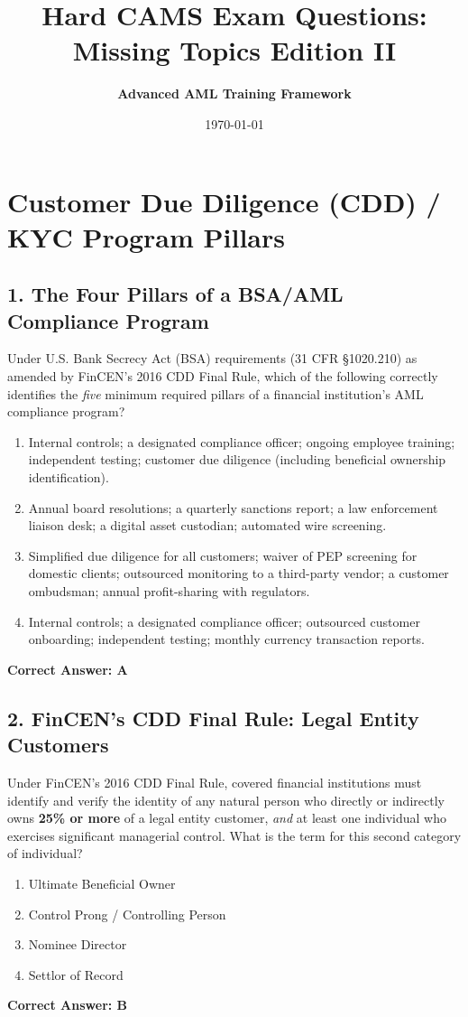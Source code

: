\documentclass[11pt,a4paper]{article}
\title{\textbf{Hard CAMS Exam Questions: Missing Topics Edition II}}
\author{\textbf{Advanced AML Training Framework}}
\date{\today}
\begin{document}
	
	\maketitle
	
	\section{Customer Due Diligence (CDD) / KYC Program Pillars}
	
	\subsection{1. The Four Pillars of a BSA/AML Compliance Program}
	Under U.S. Bank Secrecy Act (BSA) requirements (31 CFR \S 1020.210) as amended by FinCEN's 2016 CDD Final Rule, which of the following correctly identifies the \textit{five} minimum required pillars of a financial institution's AML compliance program?
	\begin{enumerate}[label=\Alph*.]
		\item Internal controls; a designated compliance officer; ongoing employee training; independent testing; customer due diligence (including beneficial ownership identification).
		\item Annual board resolutions; a quarterly sanctions report; a law enforcement liaison desk; a digital asset custodian; automated wire screening.
		\item Simplified due diligence for all customers; waiver of PEP screening for domestic clients; outsourced monitoring to a third-party vendor; a customer ombudsman; annual profit-sharing with regulators.
		\item Internal controls; a designated compliance officer; outsourced customer onboarding; independent testing; monthly currency transaction reports.
	\end{enumerate}
	\textbf{Correct Answer: A}
	
	\subsection{2. FinCEN's CDD Final Rule: Legal Entity Customers}
	Under FinCEN's 2016 CDD Final Rule, covered financial institutions must identify and verify the identity of any natural person who directly or indirectly owns \textbf{25\% or more} of a legal entity customer, \textit{and} at least one individual who exercises significant managerial control. What is the term for this second category of individual?
	\begin{enumerate}[label=\Alph*.]
		\item Ultimate Beneficial Owner
		\item Control Prong / Controlling Person
		\item Nominee Director
		\item Settlor of Record
	\end{enumerate}
	\textbf{Correct Answer: B}
	
\end{document}
